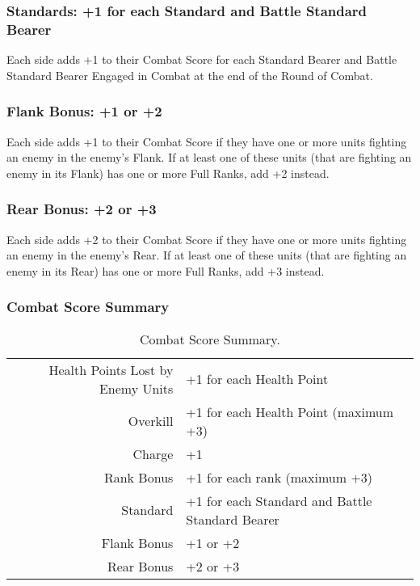 \subsubsection{Standards: +1 for each Standard and Battle Standard Bearer}

Each side adds +1 to their Combat Score for each Standard Bearer and Battle Standard Bearer Engaged in Combat at the end of the Round of Combat.





\subsubsection{Flank Bonus: +1 or +2}

Each side adds +1 to their Combat Score if they have one or more units fighting an enemy in the enemy's Flank. If at least one of these units (that are fighting an enemy in its Flank) has one or more Full Ranks, add +2 instead.
 
\subsubsection{Rear Bonus: +2 or +3}

Each side adds +2 to their Combat Score if they have one or more units fighting an enemy in the enemy's Rear. If at least one of these units (that are fighting an enemy in its Rear) has one or more Full Ranks, add +3 instead.

\subsubsection{Combat Score Summary}

\begin{table}[!htbp]
\centering
\begin{tabular}{r l }
\toprule
Health Points Lost by Enemy Units & +1 for each Health Point\\
Overkill & +1 for each Health Point (maximum +3)\\
Charge & +1 \\
Rank Bonus & +1 for each rank (maximum +3)\\
Standard & +1 for each Standard and Battle Standard Bearer \\
Flank Bonus & +1 or +2 \\
Rear Bonus & +2 or +3\\
\bottomrule
\end{tabular}
\caption{Combat Score Summary.}
\label{table/combat_score}
\end{table}



